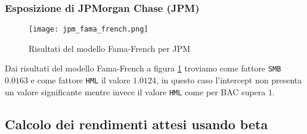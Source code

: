 \pagebreak

\subsubsection{Esposizione di JPMorgan Chase (JPM)}

\begin{figure}[ht]
    \centering
    \texttt{[image: jpm\_fama\_french.png]}
    \caption{Risultati del modello Fama-French per JPM}
    \label{fig:jpm_fama_french}
\end{figure}

Dai risultati del modello Fama-French a figura \ref{fig:jpm_fama_french} troviamo come fattore \verb|SMB| $0.0163$ e come fattore \verb|HML| il valore $1.0124$, 
in questo caso l'intercept non presenta un valore significante mentre invece il valore \verb|HML| come per BAC supera $1$.

\subsection{Calcolo dei rendimenti attesi usando beta}

